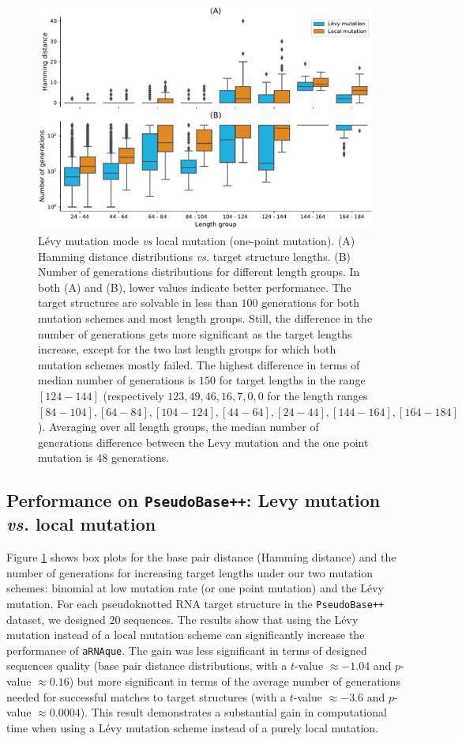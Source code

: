 \begin{figure}[H]
	\includegraphics[width=1.0 \linewidth]{../res/images/arnaque/fig4.pdf}
	\small \caption{Lévy mutation mode \emph{vs} local mutation (one-point mutation). (A) Hamming distance distributions \emph{vs.} target structure lengths. (B)  Number of generations distributions for different length groups. In both (A) and (B), lower values indicate better performance. The target structures are solvable in less than $100$ generations for both mutation schemes and most length groups. Still, the difference in the number of generations gets more significant as the target lengths increase, except for the two last length groups for which both mutation schemes mostly failed. The highest difference in terms of median number of generations is $150$ for target lengths in the range $[124-144]$ (respectively $123, 49, 46, 16, 7, 0, 0$ for the length ranges $[84-104], [64-84], [104-124], [44-64], [24-44], [144-164], [164-184]$). Averaging over all length groups, the median number of generations difference between the Levy mutation and the one point mutation is $48$ generations. }\label{Fig:OP_vs_aRNAque}
\end{figure}
\subsection{Performance on \texttt{PseudoBase++}: Levy mutation \emph{vs.} local mutation}
Figure \ref{Fig:OP_vs_aRNAque} shows box plots for the base pair distance (Hamming distance) and the number of generations for increasing target lengths under our two mutation schemes: binomial at low mutation rate (or one point mutation) and the Lévy mutation. For each pseudoknotted RNA target structure in the \texttt{PseudoBase++} dataset, we designed $20$ sequences.  The results show that using the Lévy mutation instead of a local mutation scheme can significantly increase the performance of \texttt{aRNAque}.  The gain was less significant in terms of designed sequences quality  (base pair distance distributions, with a $t$-value $\approx -1.04$ and $p$-value $\approx 0.16$) but more significant in terms of the average number of generations needed for successful matches to target structures (with a $t$-value $\approx -3.6$ and $p$-value $\approx 0.0004$). This result demonstrates a substantial gain in computational time when using a Lévy mutation scheme instead of a purely local mutation.

